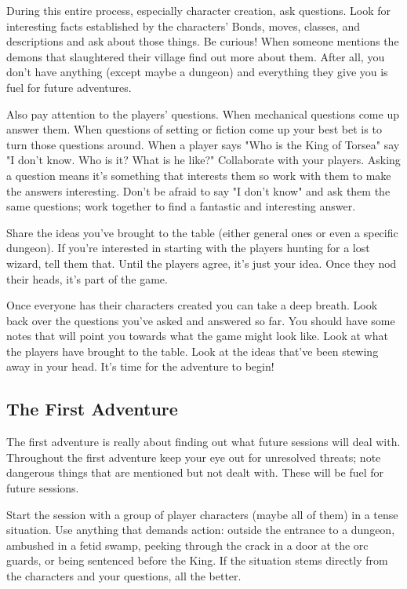 During this entire process, especially character creation, ask questions. Look for interesting facts established by the characters' Bonds, moves, classes, and descriptions and ask about those things. Be curious! When someone mentions the demons that slaughtered their village find out more about them. After all, you don't have anything (except maybe a dungeon) and everything they give you is fuel for future adventures.

 

Also pay attention to the players' questions. When mechanical questions come up answer them. When questions of setting or fiction come up your best bet is to turn those questions around. When a player says "Who is the King of Torsea" say "I don't know. Who is it? What is he like?" Collaborate with your players. Asking a question means it's something that interests them so work with them to make the answers interesting. Don't be afraid to say "I don't know" and ask them the same questions; work together to find a fantastic and interesting answer.

 

Share the ideas you've brought to the table (either general ones or even a specific dungeon). If you're interested in starting with the players hunting for a lost wizard, tell them that. Until the players agree, it's just your idea. Once they nod their heads, it's part of the game.

 

Once everyone has their characters created you can take a deep breath. Look back over the questions you've asked and answered so far. You should have some notes that will point you towards what the game might look like. Look at what the players have brought to the table. Look at the ideas that've been stewing away in your head. It's time for the adventure to begin!

 
\subsection{The First Adventure}   
 

The first adventure is really about finding out what future sessions will deal with. Throughout the first adventure keep your eye out for unresolved threats; note dangerous things that are mentioned but not dealt with. These will be fuel for future sessions.

 

Start the session with a group of player characters (maybe all of them) in a tense situation. Use anything that demands action: outside the entrance to a dungeon, ambushed in a fetid swamp, peeking through the crack in a door at the orc guards, or being sentenced before the King. If the situation stems directly from the characters and your questions, all the better.


